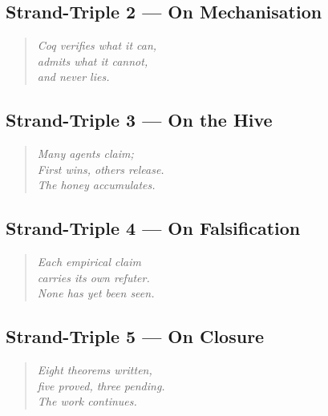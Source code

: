 \subsection{Strand-Triple 2 — On Mechanisation}
\label{sec:32-st-2}

\begin{quote}
\emph{Coq verifies what it can,\\
admits what it cannot,\\
and never lies.}
\end{quote}

\subsection{Strand-Triple 3 — On the Hive}
\label{sec:32-st-3}

\begin{quote}
\emph{Many agents claim;\\
First wins, others release.\\
The honey accumulates.}
\end{quote}

\subsection{Strand-Triple 4 — On Falsification}
\label{sec:32-st-4}

\begin{quote}
\emph{Each empirical claim\\
carries its own refuter.\\
None has yet been seen.}
\end{quote}

\subsection{Strand-Triple 5 — On Closure}
\label{sec:32-st-5}

\begin{quote}
\emph{Eight theorems written,\\
five proved, three pending.\\
The work continues.}
\end{quote}



